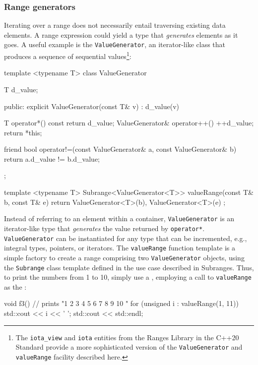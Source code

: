 {{\subsubsection[Range generators]{Range generators}\label{range-generators}

Iterating over a range does not necessarily entail traversing existing
data elements. A range expression could yield a type that
\emph{generates} elements as it goes. A useful example is the
\lstinline!ValueGenerator!, an iterator-like class that produces a sequence
of sequential values{\cprotect\footnote{The \lstinline!iota_view! and
\lstinline!iota! entities from the Ranges Library in the C++20 Standard
provide a more sophisticated version of the \lstinline!ValueGenerator!
  and \lstinline!valueRange! facility described here.}}:

\begin{emcppslisting}
template <typename T>
class ValueGenerator
{
    T d_value;

  public:
    explicit ValueGenerator(const T& v) : d_value(v) { }

    T operator*() const { return d_value; }
    ValueGenerator& operator++() { ++d_value; return *this; }

    friend bool operator!=(const ValueGenerator& a, const ValueGenerator& b)
    {
        return a.d_value != b.d_value;
    }
};

template <typename T>
Subrange<ValueGenerator<T>> valueRange(const T& b, const T& e)
{
    return { ValueGenerator<T>(b), ValueGenerator<T>(e) };
}
\end{emcppslisting}
    

\noindent Instead of referring to an element within a container,
\lstinline!ValueGenerator! is an iterator-like type that \emph{generates}
the value returned by \lstinline!operator*!. \lstinline!ValueGenerator! can be
instantiated for any type that can be incremented, e.g., integral types,
pointers, or iterators. The \lstinline!valueRange! function template is a
simple factory to create a range comprising two \lstinline!ValueGenerator!
objects, using the \lstinline!Subrange! class template defined in the use
case described in {Subranges}. Thus, to print the numbers from 1 to 10,
simply use a , employing a call to
\lstinline!valueRange! as the :

\begin{emcppslisting}
void f3()
{
    // prints "1 2 3 4 5 6 7 8 9 10 "
    for (unsigned i : valueRange(1, 11))
    {
        std::cout << i << ' ';
    }
    std::cout << std::endl;
}
\end{emcppslisting}
    

}}
